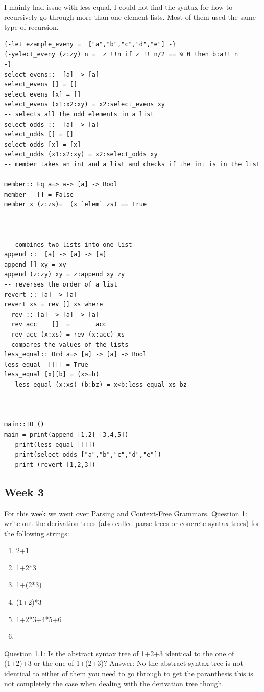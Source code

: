 \documentclass{article}
\theoremstyle{theorem}
\theoremstyle{definition}
\theoremstyle{remark}
\begin{document}
\begin{enumerate}
\begin{enumerate}
\begin{enumerate}
\end{enumerate}





I mainly had issue with less equal. I could not find the syntax for how to recursively go through more than one element lists. Most of them used the same type of recursion.


\begin{lstlisting}
{-let ezample_eveny =  ["a","b","c","d","e"] -}
{-yelect_eveny (z:zy) n =  z !!n if z !! n/2 == % 0 then b:a!! n 
-}
select_evens::  [a] -> [a]
select_evens [] = []
select_evens [x] = []
select_evens (x1:x2:xy) = x2:select_evens xy
-- selects all the odd elements in a list
select_odds ::  [a] -> [a]
select_odds [] = []
select_odds [x] = [x]
select_odds (x1:x2:xy) = x2:select_odds xy
-- member takes an int and a list and checks if the int is in the list

member:: Eq a=> a-> [a] -> Bool
member _ [] = False
member x (z:zs)=  (x `elem` zs) == True



-- combines two lists into one list
append ::  [a] -> [a] -> [a]
append [] xy = xy
append (z:zy) xy = z:append xy zy
-- reverses the order of a list
revert :: [a] -> [a]
revert xs = rev [] xs where
  rev :: [a] -> [a] -> [a] 
  rev acc    []  =       acc
  rev acc (x:xs) = rev (x:acc) xs
--compares the values of the lists
less_equal:: Ord a=> [a] -> [a] -> Bool
less_equal  [][] = True
less_equal [x][b] = (x>=b)
-- less_equal (x:xs) (b:bz) = x<b:less_equal xs bz



main::IO ()
main = print(append [1,2] [3,4,5])
-- print(less_equal [][])
-- print(select_odds ["a","b","c","d","e"])
-- print (revert [1,2,3])
\end{lstlisting}
\subsection{Week 3}
For this week we went over Parsing and Context-Free Grammars.
Question 1:
write out the derivation trees (also called parse trees or concrete syntax trees) for the following strings:
\begin{enumerate}

\item 2+1
\item 1+2*3
\item 1+(2*3)
\item (1+2)*3
\item 1+2*3+4*5+6
\item \end{enumerate}
    \end{enumerate}
    Question 1.1:
    Is the abstract syntax tree of 1+2+3 identical to the one of (1+2)+3 or the one of 1+(2+3)?
    Answer: No the abstract syntax tree is not identical to either of them you need to go through to get the paranthesis this is not completely the case when dealing with the derivation tree though.
    

\end{enumerate}
\end{document}
